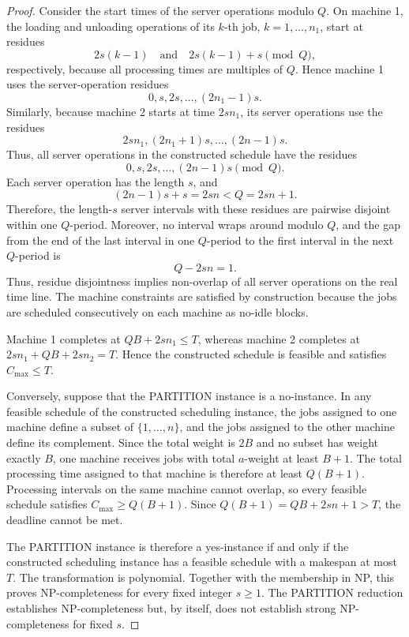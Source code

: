 \documentclass[11pt]{article}
\begin{document}
\begin{proof}
Consider the start times of the server operations modulo \(Q\). On machine 1, the
loading and unloading operations of its \(k\)-th job, \(k=1,\ldots,n_1\), start at
residues
\[
2s(k-1)
\quad\text{and}\quad
2s(k-1)+s
\pmod Q,
\]
respectively, because all processing times are multiples of \(Q\). Hence machine 1
uses the server-operation residues
\[
0,s,2s,\ldots,(2n_1-1)s.
\]
Similarly, because machine 2 starts at time \(2sn_1\), its server operations use the
residues
\[
2sn_1,(2n_1+1)s,\ldots,(2n-1)s.
\]
Thus, all server operations in the constructed schedule have the residues
\[
0,s,2s,\ldots,(2n-1)s
\pmod Q.
\]
Each server operation has the length \(s\), and
\[
(2n-1)s+s=2sn<Q=2sn+1.
\]
Therefore, the length-\(s\) server intervals with these residues are pairwise
disjoint within one \(Q\)-period. Moreover, no interval wraps around modulo \(Q\),
and the gap from the end of the last interval in one \(Q\)-period to the first
interval in the next \(Q\)-period is
\[
Q-2sn=1.
\]
Thus, residue disjointness implies non-overlap of all server operations on the real
time line. The machine constraints are satisfied by construction because the jobs are
scheduled consecutively on each machine as no-idle blocks.

Machine 1 completes at \(QB+2sn_1\le T\), whereas machine 2 completes at \(2sn_1+QB+2sn_2=T\).
Hence the constructed schedule is feasible and satisfies \(C_{\max}\le T\).

Conversely, suppose that the PARTITION instance is a no-instance. In any feasible
schedule of the constructed scheduling instance, the jobs assigned to one machine
define a subset of \(\{1,\ldots,n\}\), and the jobs assigned to the other machine
define its complement. Since the total weight is \(2B\) and no subset has weight
exactly \(B\), one machine receives jobs with total \(a\)-weight at least \(B+1\).
The total processing time assigned to that machine is therefore at least \(Q(B+1)\). Processing intervals on the same machine cannot overlap, so every feasible schedule satisfies \(C_{\max}\ge Q(B+1)\). Since \(Q(B+1)=QB+2sn+1>T\),
the deadline cannot be met.

The PARTITION instance is therefore a yes-instance if and only if the constructed
scheduling instance has a feasible schedule with a makespan at most \(T\). The
transformation is polynomial. Together with the membership in NP, this proves NP-completeness for every fixed
integer \(s\ge1\). The PARTITION reduction establishes NP-completeness but, by itself,
does not establish strong NP-completeness for fixed \(s\).
\end{proof}
\vspace{1em}
\end{document}
